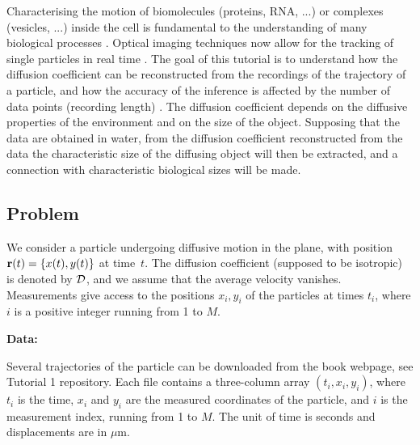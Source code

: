 \documentclass{article}
\def\DD{{\cal D}}
\begin{document}

Characterising the motion of biomolecules (proteins, RNA, ...) or complexes (vesicles, ...) inside the cell is fundamental to the understanding of many biological processes \cite{berg99}. Optical imaging techniques now allow for the tracking of single particles in real time \cite{ruthardt}. The goal of this tutorial is to understand how the diffusion coefficient can be reconstructed from the recordings of the trajectory of a particle, and how the accuracy of the inference is affected by the number of data points (recording length) \cite{robson}. 
The diffusion coefficient depends on the diffusive properties of the environment and on the size of the object. Supposing that the data are obtained in water, from the diffusion coefficient reconstructed from the data  the characteristic size of the diffusing object  will then be extracted, and a connection with characteristic biological sizes will be made.  

\subsection*{Problem}


We consider a particle undergoing diffusive motion in the plane, with position ${\bf r}(t) = \{  x(t),  y(t) \}$ at time~$t$. 
The diffusion coefficient (supposed to be isotropic) is denoted by $\DD$, and we assume that the average velocity vanishes. Measurements give access to the positions $x_i,y_i$ of the particles at times $t_i$, where $i$ is a positive integer running from 1 to $M$.

\medskip

\noindent
{\bf Data:}

Several trajectories of the particle can be downloaded from the book webpage, see Tutorial 1 repository. 
Each file contains a three-column array $(t_i,x_i,y_i)$, where $t_i$ is the time, $x_i$ and $y_i$ are the measured coordinates of the particle, 
and $i$ is the measurement index, running from 1 to $M$.
The unit of time is seconds and displacements  are in  $\mu$m.

\medskip
\end{document}
